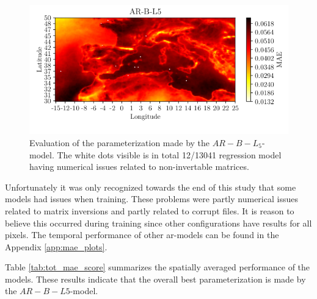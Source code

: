 \begin{figure}[ht]
    \centering
    \includegraphics{python_figs/mea_best_ar_model_tcc_L5_in_folder_AR-B-L5.png}
    \caption{Evaluation of the parameterization made by the $AR-B-L_5$-model. The white dots visible is in total 12/13041 regression model having numerical issues related to non-invertable matrices.}
    \label{fig:MAE_AR}
\end{figure}


Unfortunately it was only recognized towards the end of this study that 
some models had issues when training. These problems were partly numerical issues related to matrix inversions and partly related to corrupt files. It is reason to believe this occurred during training since other configurations have results for all pixels. The temporal performance of other \acrshort{ar}-models can be found in the Appendix \ref{app:mae_plots}.

Table \ref{tab:tot_mae_score} summarizes the spatially averaged performance of the models. These results indicate that the overall best parameterization is made by the $AR-B-L5$-model. %


